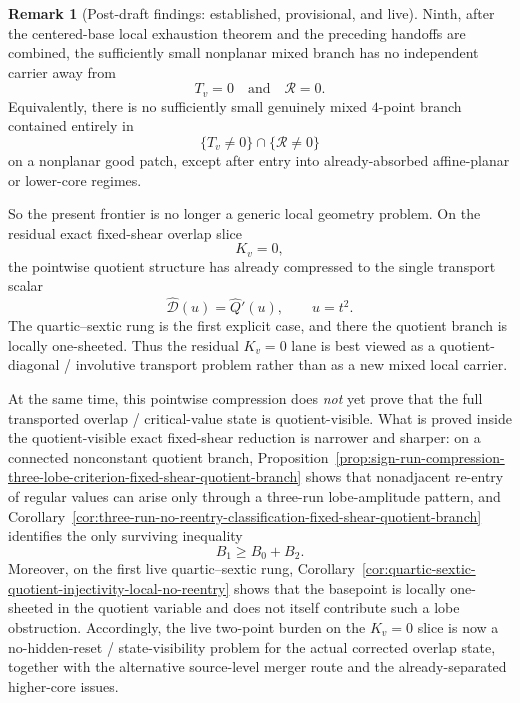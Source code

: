 \documentclass[11pt,a4paper]{amsart}
\theoremstyle{plain}
\theoremstyle{definition}
\newtheorem{remark}[theorem]{Remark}
\begin{document}
\begin{remark}[Post-draft findings: established, provisional, and live]
Ninth, after the centered-base local exhaustion theorem and the preceding
handoffs are combined, the sufficiently small nonplanar mixed branch has no
independent carrier away from
\[
T_v=0
\quad\text{and}\quad
\mathcal R=0.
\]
Equivalently, there is no sufficiently small genuinely mixed $4$-point branch
contained entirely in
\[
\{T_v\neq 0\}\cap\{\mathcal R\neq 0\}
\]
on a nonplanar good patch, except after entry into already-absorbed
affine-planar or lower-core regimes.

So the present frontier is no longer a generic local geometry problem. On the
residual exact fixed-shear overlap slice
\[
K_v=0,
\]
the pointwise quotient structure has already compressed to the single
transport scalar
\[
\widehat{\mathcal D}(u)=\widehat Q'(u),
\qquad
u=t^2.
\]
The quartic--sextic rung is the first explicit case, and there the quotient
branch is locally one-sheeted. Thus the residual $K_v=0$ lane is best viewed
as a quotient-diagonal / involutive transport problem rather than as a new
mixed local carrier.

At the same time, this pointwise compression does \emph{not} yet prove that the
full transported overlap / critical-value state is quotient-visible. What is
proved inside the quotient-visible exact fixed-shear reduction is narrower and
sharper: on a connected nonconstant quotient branch,
Proposition~\ref{prop:sign-run-compression-three-lobe-criterion-fixed-shear-quotient-branch}
shows that nonadjacent re-entry of regular values can arise only through a
three-run lobe-amplitude pattern, and
Corollary~\ref{cor:three-run-no-reentry-classification-fixed-shear-quotient-branch}
identifies the only surviving inequality
\[
B_1\ge B_0+B_2.
\]
Moreover, on the first live quartic--sextic rung,
Corollary~\ref{cor:quartic-sextic-quotient-injectivity-local-no-reentry}
shows that the basepoint is locally one-sheeted in the quotient variable and
does not itself contribute such a lobe obstruction. Accordingly, the live
two-point burden on the $K_v=0$ slice is now a no-hidden-reset /
state-visibility problem for the actual corrected overlap state, together with
the alternative source-level merger route and the already-separated higher-core
issues.
\end{remark}
\end{document}
